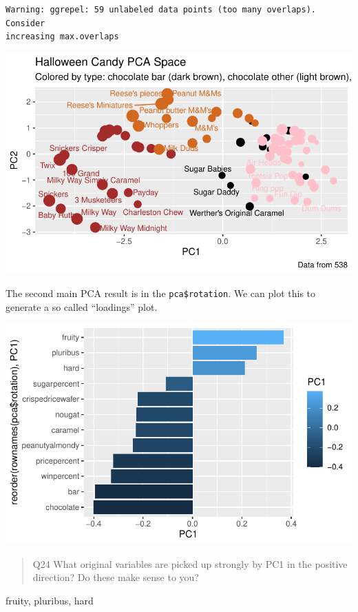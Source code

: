 \documentclass[
  letterpaper,
  DIV=11,
  numbers=noendperiod]{scrartcl}
\newenvironment{Shaded}{\begin{snugshade}}{\end{snugshade}}
\newcommand{\AttributeTok}[1]{\textcolor[rgb]{0.40,0.45,0.13}{#1}}
\newcommand{\FunctionTok}[1]{\textcolor[rgb]{0.28,0.35,0.67}{#1}}
\newcommand{\NormalTok}[1]{\textcolor[rgb]{0.00,0.23,0.31}{#1}}
\newcommand{\SpecialCharTok}[1]{\textcolor[rgb]{0.37,0.37,0.37}{#1}}
\begin{document}
\begin{verbatim}
Warning: ggrepel: 59 unlabeled data points (too many overlaps). Consider
increasing max.overlaps
\end{verbatim}

\includegraphics{Class09_files/figure-pdf/unnamed-chunk-24-1.pdf}

The second main PCA result is in the \texttt{pca\$rotation}. We can plot
this to generate a so called ``loadings'' plot.

\begin{Shaded}
\end{Shaded}

\includegraphics{Class09_files/figure-pdf/unnamed-chunk-25-1.pdf}

\begin{quote}
Q24 What original variables are picked up strongly by PC1 in the
positive direction? Do these make sense to you?
\end{quote}

fruity, pluribus, hard
\end{document}

